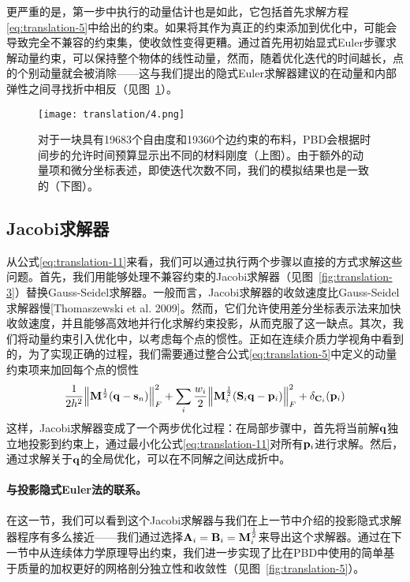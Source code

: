 \begin{translation}
更严重的是，第一步中执行的动量估计也是如此，它包括首先求解方程\eqref{eq:translation-5}中给出的约束。如果将其作为真正的约束添加到优化中，可能会导致完全不兼容的约束集，使收敛性变得更糟。通过首先用初始显式Euler步骤求解动量约束，可以保持整个物体的线性动量，然而，随着优化迭代的时间越长，点的个别动量就会被消除——这与我们提出的隐式Euler求解器建议的在动量和内部弹性之间寻找折中相反（见图~\ref{fig:translation-4}）。

\begin{figure}
  \centering
  \texttt{[image: translation/4.png]}
  \caption{
    对于一块具有\num{19683}个自由度和\num{19360}个边约束的布料，PBD会根据时间步的允许时间预算显示出不同的材料刚度（上图）。由于额外的动量项和微分坐标表述，即使迭代次数不同，我们的模拟结果也是一致的（下图）。
  }
  \label{fig:translation-4}
\end{figure}

\subsection{Jacobi求解器}

从公式\eqref{eq:translation-11}来看，我们可以通过执行两个步骤以直接的方式求解这些问题。首先，我们用能够处理不兼容约束的Jacobi求解器（见图~\ref{fig:translation-3}）替换Gauss-Seidel求解器。一般而言，Jacobi求解器的收敛速度比Gauss-Seidel求解器慢[Thomaszewski et al. 2009]。然而，它们允许使用差分坐标表示法来加快收敛速度，并且能够高效地并行化求解约束投影，从而克服了这一缺点。其次，我们将动量约束引入优化中，以考虑每个点的惯性。正如在连续介质力学视角中看到的，为了实现正确的过程，我们需要通过整合公式\eqref{eq:translation-5}中定义的动量约束项来加回每个点的惯性
\begin{equation}
  \frac{1}{2 h^2} \norm{\vb{M}^{\frac{1}{2}} (\vb{q} - \vb{s}_n)}_F^2 + \sum_i \frac{w_i}{2} \norm{\vb{M}_i^{\frac{1}{2}} (\vb{S}_i \vb{q} - \vb{p}_i)}_F^2 + \delta_{\vb{C}_i}(\vb{p}_i)
  \label{eq:translation-14}
\end{equation}
这样，Jacobi求解器变成了一个两步优化过程：在局部步骤中，首先将当前解$\vb{q}$独立地投影到约束上，通过最小化公式\eqref{eq:translation-11}对所有$\vb{p}_i$进行求解。然后，通过求解关于$\vb{q}$的全局优化，可以在不同解之间达成折中。

\paragraph{与投影隐式Euler法的联系。}

在这一节，我们可以看到这个Jacobi求解器与我们在上一节中介绍的投影隐式求解器程序有多么接近——我们通过选择$\vb{A}_i = \vb{B}_i = \vb{M}_i^{\frac{1}{2}}$来导出这个求解器。通过在下一节中从连续体力学原理导出约束，我们进一步实现了比在PBD中使用的简单基于质量的加权更好的网格剖分独立性和收敛性（见图~\ref{fig:translation-5}）。


\end{translation}

